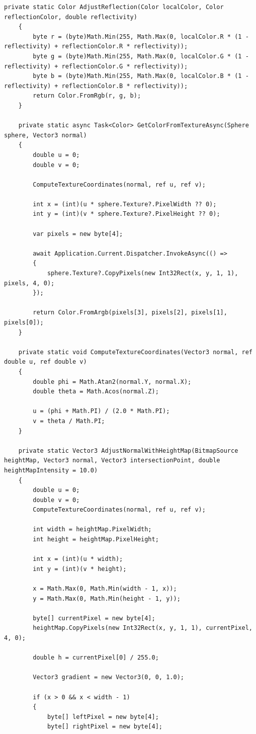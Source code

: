 \begin{lstlisting}[caption={Класс RayTracingService}, label={lst:3-5}]
	private static Color AdjustReflection(Color localColor, Color reflectionColor, double reflectivity)
	{
		byte r = (byte)Math.Min(255, Math.Max(0, localColor.R * (1 - reflectivity) + reflectionColor.R * reflectivity));
		byte g = (byte)Math.Min(255, Math.Max(0, localColor.G * (1 - reflectivity) + reflectionColor.G * reflectivity));
		byte b = (byte)Math.Min(255, Math.Max(0, localColor.B * (1 - reflectivity) + reflectionColor.B * reflectivity));
		return Color.FromRgb(r, g, b);
	}
	
	private static async Task<Color> GetColorFromTextureAsync(Sphere sphere, Vector3 normal)
	{
		double u = 0;
		double v = 0;
		
		ComputeTextureCoordinates(normal, ref u, ref v);
		
		int x = (int)(u * sphere.Texture?.PixelWidth ?? 0);
		int y = (int)(v * sphere.Texture?.PixelHeight ?? 0);
		
		var pixels = new byte[4];
		
		await Application.Current.Dispatcher.InvokeAsync(() =>
		{
			sphere.Texture?.CopyPixels(new Int32Rect(x, y, 1, 1), pixels, 4, 0);
		});
		
		return Color.FromArgb(pixels[3], pixels[2], pixels[1], pixels[0]);
	}
	
	private static void ComputeTextureCoordinates(Vector3 normal, ref double u, ref double v)
	{
		double phi = Math.Atan2(normal.Y, normal.X);
		double theta = Math.Acos(normal.Z);
		
		u = (phi + Math.PI) / (2.0 * Math.PI);
		v = theta / Math.PI;
	}
	
	private static Vector3 AdjustNormalWithHeightMap(BitmapSource heightMap, Vector3 normal, Vector3 intersectionPoint, double heightMapIntensity = 10.0)
	{
		double u = 0;
		double v = 0;
		ComputeTextureCoordinates(normal, ref u, ref v);
		
		int width = heightMap.PixelWidth;
		int height = heightMap.PixelHeight;
		
		int x = (int)(u * width);
		int y = (int)(v * height);
		
		x = Math.Max(0, Math.Min(width - 1, x));
		y = Math.Max(0, Math.Min(height - 1, y));
		
		byte[] currentPixel = new byte[4];
		heightMap.CopyPixels(new Int32Rect(x, y, 1, 1), currentPixel, 4, 0);
		
		double h = currentPixel[0] / 255.0;
		
		Vector3 gradient = new Vector3(0, 0, 1.0);
		
		if (x > 0 && x < width - 1)
		{
			byte[] leftPixel = new byte[4];
			byte[] rightPixel = new byte[4];
			

\end{lstlisting}

